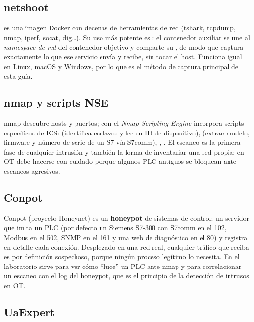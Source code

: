 \subsection{netshoot}
\label{sec:netshoot}

 es una imagen Docker con decenas de herramientas de red (tshark, tcpdump, nmap, iperf, socat, dig\ldots). Su uso más potente es : el contenedor auxiliar se une al \emph{namespace de red} del contenedor objetivo y comparte su , de modo que  captura exactamente lo que ese servicio envía y recibe, sin tocar el host. Funciona igual en Linux, macOS y Windows, por lo que es el método de captura principal de esta guía.

\subsection{nmap y scripts NSE}

nmap descubre hosts y puertos; con el \emph{Nmap Scripting Engine} incorpora scripts específicos de ICS:  (identifica esclavos y lee su ID de dispositivo),  (extrae modelo, firmware y número de serie de un S7 vía S7comm), , . El escaneo es la primera fase de cualquier intrusión y también la forma de inventariar una red propia; en OT debe hacerse con cuidado porque algunos PLC antiguos se bloquean ante escaneos agresivos.

\subsection{Conpot}

Conpot (proyecto Honeynet) es un \textbf{honeypot} de sistemas de control: un servidor que imita un PLC (por defecto un Siemens S7-300 con S7comm en el 102, Modbus en el 502, SNMP en el 161 y una web de diagnóstico en el 80) y registra en detalle cada conexión. Desplegado en una red real, cualquier tráfico que reciba es por definición sospechoso, porque ningún proceso legítimo lo necesita. En el laboratorio sirve para ver cómo ``luce'' un PLC ante nmap y para correlacionar un escaneo con el log del honeypot, que es el principio de la detección de intrusos en OT.

\subsection{UaExpert}

